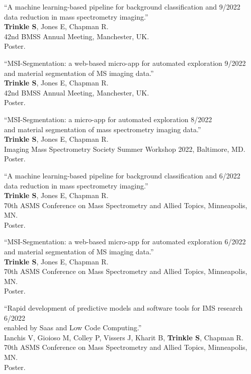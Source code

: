 \documentclass[10pt,letterpaper]{article}
\begin{document}
\begin{benumerate}{17}
\item{``A machine learning-based pipeline for background classification and \hfill 9/2022\\ data reduction in mass spectrometry imaging.''\\
    \textbf{Trinkle S}, Jones E, Chapman R.\\
    42nd BMSS Annual Meeting, Manchester, UK.\\
    Poster.}
  
\item{``MSI-Segmentation: a web-based micro-app for automated exploration \hfill 9/2022\\ and material segmentation of MS imaging data.''\\
    \textbf{Trinkle S}, Jones E, Chapman R.\\
    42nd BMSS Annual Meeting, Manchester, UK.\\
    Poster.}

\item{``MSI-Segmentation: a micro-app for automated exploration \hfill 8/2022\\ and material segmentation of mass spectrometry imaging data.''\\
    \textbf{Trinkle S}, Jones E, Chapman R.\\
    Imaging Mass Spectrometry Society Summer Workshop 2022, Baltimore, MD.\\
    Poster.}
  
\item{``A machine learning-based pipeline for background classification and \hfill 6/2022\\ data reduction in mass spectrometry imaging.''\\
    \textbf{Trinkle S}, Jones E, Chapman R.\\
    70th ASMS Conference on Mass Spectrometry and Allied Topics, Minneapolis, MN.\\
    Poster.}
  
\item{``MSI-Segmentation: a web-based micro-app for automated exploration \hfill 6/2022\\ and material segmentation of MS imaging data.''\\
    \textbf{Trinkle S}, Jones E, Chapman R.\\
    70th ASMS Conference on Mass Spectrometry and Allied Topics, Minneapolis, MN.\\
    Poster.}
  
\item{``Rapid development of predictive models and software tools for IMS research \hfill 6/2022\\ enabled by Saas and Low Code Computing.''\\
    Ianchis V, Gioioso M, Colley P, Vissers J, Kharit B, \textbf{Trinkle S}, Chapman R.\\
    70th ASMS Conference on Mass Spectrometry and Allied Topics, Minneapolis, MN.\\
    Poster.}
  

\end{benumerate}
\end{document}
